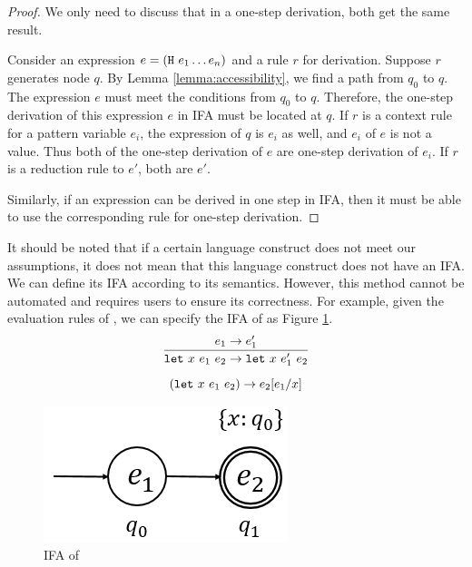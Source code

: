 \begin{proof}
    We only need to discuss that in a one-step derivation, both get the same result.

    Consider an expression $e=(\mbox{\tt H}~e_1 \ldots e_n)$ and a rule $r$ for derivation. Suppose $r$ generates node $q$. By Lemma \ref{lemma:accessibility}, we find a path from $q_0$ to $q$. The expression $e$ must meet the conditions from $q_0$ to $q$. Therefore, the one-step derivation of this expression $e$ in IFA must be located at $q$. If $r$ is a context rule for a pattern variable $e_i$, the expression of $q$ is $e_i$ as well, and $e_i$ of $e$ is not a value. Thus both of the one-step derivation of $e$ are one-step derivation of $e_i$. If $r$ is a reduction rule to $e'$, both are $e'$.

    Similarly, if an expression can be derived in one step in IFA, then it must be able to use the corresponding rule for one-step derivation.
\end{proof}


It should be noted that if a certain language construct does not meet our assumptions, it does not mean that this language construct does not have an IFA. We can define its IFA according to its semantics. However, this method cannot be automated and requires users to ensure its correctness. For example, given the evaluation rules of , we can specify the IFA of  as Figure \ref{fig:ifa-let}.
\[
    \infer{\m{let}~x~e_1~e_2 \to \m{let}~x~e_1'~e_2}{e_1 \to e_1'}
\]\[
    (\mbox{\tt let}~x~e_1~e_2) \to e_2[e_1/x]
\]


\begin{figure}[t]
    \centering
    \includegraphics[scale=0.25]{images/ifa/ifa-let.png}
    \caption{IFA of }
    \label{fig:ifa-let}
\end{figure}

